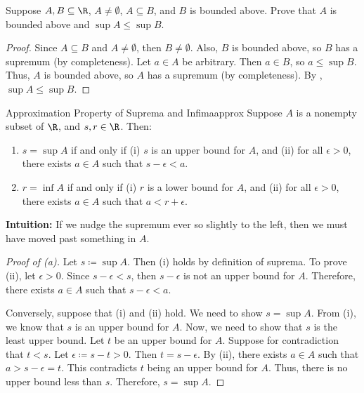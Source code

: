 \begin{exbox}{}{}
    Suppose $A,B \subseteq \R$, $A \neq \emptyset$, $A \subseteq B$, and $B$ is bounded above. Prove that $A$ is bounded above and $\sup A \leq \sup B$.
    \tcblower
    \begin{proof}
        Since $A \subseteq B$ and $A \neq \emptyset$, then $B \neq \emptyset$. Also, $B$ is bounded above, so $B$ has a supremum (by completeness). Let $a \in A$ be arbitrary. Then $a \in B$, so $a \leq \sup B$. Thus, $A$ is bounded above, so $A$ has a supremum (by completeness). By , $\sup A \leq \sup B$.
    \end{proof}
\end{exbox}

\begin{thmbox}{Approximation Property of Suprema and Infima}{approx}
    Suppose $A$ is a nonempty subset of $\R$, and $s,r \in \R$. Then:
    \begin{enumerate}[label=(\alph*)]
        \item $s = \sup A$ if and only if (i) $s$ is an upper bound for $A$, and (ii) for all $\epsilon > 0$, there exists $a \in A$ such that $s - \epsilon < a$.
        \item $r = \inf A$ if and only if (i) $r$ is a lower bound for $A$, and (ii) for all $\epsilon > 0$, there exists $a \in A$ such that $a < r + \epsilon$.
    \end{enumerate}
    \tcblower
    \textbf{Intuition:} If we nudge the supremum ever so slightly to the left, then we must have moved past something in $A$.
    \begin{proof}[Proof of (a)]
        Let $s \coloneq \sup A$. Then (i) holds by definition of suprema. To prove (ii), let $\epsilon > 0$. Since $s - \epsilon < s$, then $s - \epsilon$ is not an upper bound for $A$. Therefore, there exists $a \in A$ such that $s - \epsilon < a$.

        Conversely, suppose that (i) and (ii) hold. We need to show $s = \sup A$. From (i), we know that $s$ is an upper bound for $A$. Now, we need to show that $s$ is the least upper bound. Let $t$ be an upper bound for $A$. Suppose for contradiction that $t < s$. Let $\epsilon \coloneq s - t > 0$. Then $t = s - \epsilon$. By (ii), there exists $a \in A$ such that $a > s - \epsilon = t$. This contradicts $t$ being an upper bound for $A$. Thus, there is no upper bound less than $s$. Therefore, $s = \sup A$.
    \end{proof}
\end{thmbox}

